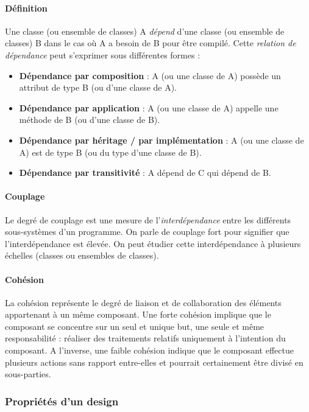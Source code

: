 \documentclass{scrartcl}
\begin{document}
    \paragraph{Définition}Une classe (ou ensemble de classes) A \emph{dépend} d'une classe (ou ensemble de classes) B dans le cas où A a besoin de B pour être compilé. Cette \emph{relation de dépendance} peut s'exprimer sous différentes formes :
    \begin{itemize}
        \item \textbf{Dépendance par composition} : A (ou une classe de A) possède un attribut de type B (ou d'une classe de A).
        \item \textbf{Dépendance par application} : A (ou une classe de A) appelle une méthode de B (ou d'une classe de B).
        \item \textbf{Dépendance par héritage / par implémentation} : A (ou une classe de A) est de type B (ou du type d'une classe de B).
        \item \textbf{Dépendance par transitivité} : A dépend de C qui dépend de B.
    \end{itemize}
    
    \paragraph{Couplage} Le degré de couplage est une mesure de l'\emph{interdépendance} entre les différents sous-systèmes d'un programme. On parle de couplage fort pour signifier que l'interdépendance est élevée. On peut étudier cette interdépendance à plusieurs échelles (classes ou ensembles de classes).

    \paragraph{Cohésion}La cohésion représente le degré de liaison et de collaboration des éléments appartenant à un même composant. Une forte cohésion implique que le composant se concentre sur un seul et unique but, une seule et même responsabilité : réaliser des traitements relatifs uniquement à l’intention du composant. A l'inverse, une faible cohésion indique que le composant effectue plusieurs actions sans rapport entre-elles et pourrait certainement être divisé en sous-parties.

\subsubsection{Propriétés d'un design}
\end{document}
